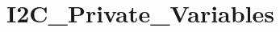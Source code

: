 \hypertarget{group___i2_c___private___variables}{}\section{I2\+C\+\_\+\+Private\+\_\+\+Variables}
\label{group___i2_c___private___variables}
